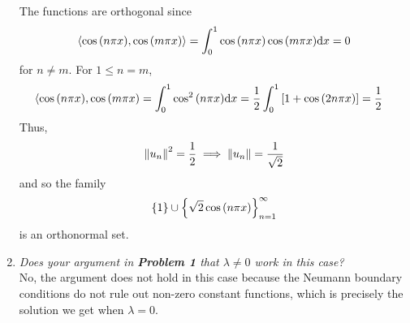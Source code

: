 \documentclass[paper=a4, fontsize=11pt]{scrartcl} %
\theoremstyle{plain}
\numberwithin{equation}{section} %
\numberwithin{figure}{section} %
\numberwithin{table}{section} %
\begin{document}
\begin{enumerate}[\bf (a)]
        The functions are orthogonal since
        \begin{align*}
            \langle \cos\qty(n\pi x), \cos\qty(m\pi x) \rangle = \int_0^1\cos\qty(n\pi x)\cos\qty(m \pi x)\dd x = 0
        \end{align*}
        for $n \neq m$.  For $1 \leq n = m$,
        \begin{align*}
            \langle \cos\qty(n\pi x), \cos\qty(m\pi x) &= \int_0^1\cos^2\qty(n\pi x)\dd x = \frac{1}{2}\int_0^1\qty[1 + \cos\qty(2n\pi x)] = \frac{1}{2}
        \end{align*}
        Thus,
        \begin{align*}
            \norm{u_n}^2 = \frac{1}{2} \implies \norm{u_n} = \frac{1}{\sqrt{2}}
        \end{align*}
        and so the family
        \begin{align*}
            \left\{1\right\}\cup\left\{\sqrt{2}\cos\qty(n\pi x)\right\}_{n=1}^\infty
        \end{align*}
        is an orthonormal set.
    \item
        \emph{Does your argument in \textbf{Problem 1} that $\lambda \neq 0$ work in this case?} \\

        No, the argument does not hold in this case because the Neumann boundary conditions do not rule out non-zero constant functions, which is precisely the solution we get when $\lambda = 0$.
\end{enumerate}
\end{document}
